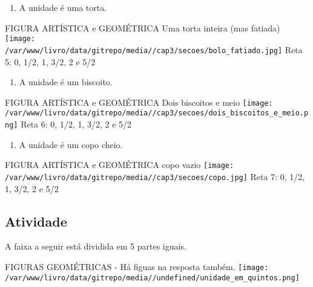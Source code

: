 \documentclass[a4,12pt]{book}
\begin{document}
\begin{enumerate} [\quad a)] %
  \item     A unidade é uma torta. 
\end{enumerate} %
\begin{imagem*}[breakable]{}{}   FIGURA ARTÍSTICA  e GEOMÉTRICA  \mbox{} \newline    Uma  torta inteira (mas fatiada)   \mbox{} \newline        \texttt{[image: /var/www/livro/data/gitrepo/media//cap3/secoes/bolo\_fatiado.jpg]}     \mbox{} \newline    Reta 5: 0, 1/2, 1, 3/2, 2 e 5/2 \end{imagem*}
\begin{enumerate} [\quad a)] %
  \item     A unidade é um biscoito. 
\end{enumerate} %
\begin{imagem*}[breakable]{}{}   FIGURA ARTÍSTICA  e GEOMÉTRICA   \mbox{} \newline    Dois biscoitos e meio   \mbox{} \newline        \texttt{[image: /var/www/livro/data/gitrepo/media//cap3/secoes/dois\_biscoitos\_e\_meio.png]}     \mbox{} \newline    Reta 6: 0, 1/2, 1, 3/2, 2 e 5/2 \end{imagem*}
\begin{enumerate} [\quad a)] %
  \item     A unidade é um copo cheio. 
\end{enumerate} %
\begin{imagem*}[breakable]{}{}   FIGURA ARTÍSTICA e GEOMÉTRICA  \mbox{} \newline     copo vazio   \mbox{} \newline        \texttt{[image: /var/www/livro/data/gitrepo/media//cap3/secoes/copo.jpg]}     \mbox{} \newline    Reta 7: 0, 1/2, 1, 3/2, 2 e 5/2 \end{imagem*}

\subsection{Atividade}

A faixa a seguir está dividida em 5 partes iguais. 
\begin{imagem*}[breakable]{}{}   FIGURAS GEOMÉTRICAS - Há figuas na resposta também.  
    \texttt{[image: /var/www/livro/data/gitrepo/media//undefined/unidade\_em\_quintos.png]}  
\end{imagem*}
\end{document}
